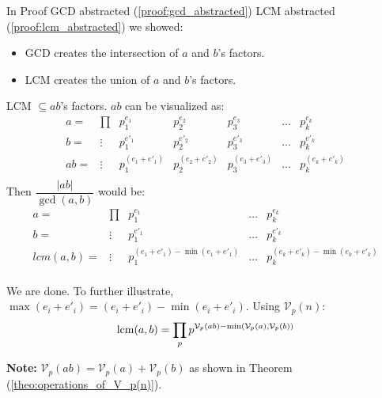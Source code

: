 \begin{Proof}

    \noindent
    In Proof GCD abstracted (\ref{proof:gcd_abstracted}) LCM abstracted (\ref{proof:lcm_abstracted}) we showed:
    \begin{itemize}
        \item GCD creates the intersection of $a$ and $b$'s factors.
        \item LCM creates the union of $a$ and $b$'s factors.
    \end{itemize}
    \noindent
    LCM $\subseteq ab$'s factors. $ab$ can be visualized as:
    \[
    \begin{array}{ccc|c|c|c|c}
    
    a=&\prod&p_1^{e_1} & p_2^{e_2} & p_3^{e_3} & \dots & p_k^{e_k} \\
    b=&\vdots&p_1^{e'_1} & p_2^{e'_2} & p_3^{e'_3} & \dots & p_k^{e'_k} \\
    \hline
    ab=&\vdots&p_1^{(e_1 + e'_1)} & p_2^{(e_2+ e'_2)} & p_3^{(e_3+ e'_3)} & \dots & p_k^{(e_k+ e'_k)} \\

    \end{array}
    \]
    Then $\dfrac{|ab|}{\gcd(a,b)}$ would be:\\
    \[
    \begin{array}{ccc|c|c}
    
    a=&\prod&p_1^{e_1} &  \dots & p_k^{e_k} \\
    b=&\vdots&p_1^{e'_1} &  \dots & p_k^{e'_k} \\
    \hline
    lcm(a,b)=&\vdots&p_1^{(e_1 + e'_1)-\min(e_1 + e'_1)} & \dots & p_k^{(e_k+ e'_k)-\min(e_k+ e'_k)} \\

    \end{array}
    \]

    \noindent
    We are done.
    To further illustrate, $\max(e_i+e'_i) = (e_i+e'_i)-\min(e_i+e'_i)$. Using $\mathcal{V}_p(n)$:\\
    \LARGE
    \[
        \operatorname{lcm}(a, b) = \prod_{p} p^{\mathcal{V}_p(ab)- \min(\mathcal{V}_p(a),\mathcal{V}_p(b))}
    \]
    \normalsize



    
    \end{Proof}

    \begin{Note}
        \textbf{Note:} $\mathcal{V}_p(ab)= \mathcal{V}_p(a) + \mathcal{V}_p(b)$ as shown in Theorem (\ref{theo:operations_of_V_p(n)}).
    \end{Note}







